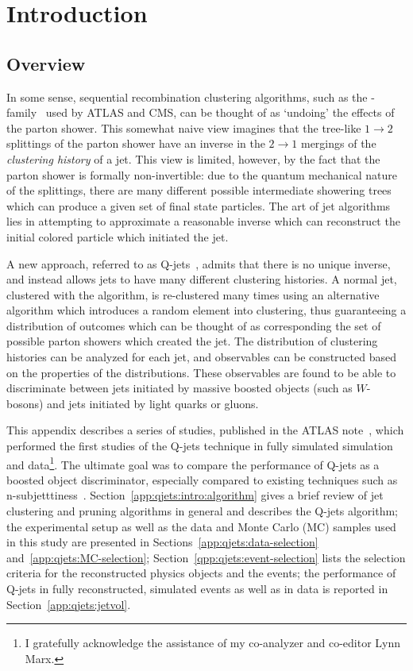 \label{appendix:qjets}

\section{Introduction}

\subsection{Overview}
\label{app:qjets:intro:overview}

In some sense, sequential recombination clustering algorithms, such as the \kt-family~\cite{Ellis:1993tq} used by ATLAS and CMS, can be thought of as `undoing' the effects of the parton shower. This somewhat naive view imagines that the tree-like $1\rightarrow2$ splittings of the parton shower have an inverse in the $2\rightarrow1$ mergings of the \textit{clustering history} of a jet. This view is limited, however, by the fact that the parton shower is formally non-invertible: due to the quantum mechanical nature of the splittings, there are many different possible intermediate showering trees which can produce a given set of final state particles. The art of jet algorithms lies in attempting to approximate a reasonable inverse which can reconstruct the initial colored particle which initiated the jet.

A new approach, referred to as Q-jets~\cite{Ellis:2012sn}, admits that there is no unique inverse, and instead allows jets to have many different clustering histories. A normal jet, clustered with the \antikt algorithm, is re-clustered many times using an alternative algorithm which introduces a random element into clustering, thus guaranteeing a distribution of outcomes which can be thought of as corresponding the set of possible parton showers which created the jet. The distribution of clustering histories can be analyzed for each jet, and observables can be constructed based on the properties of the distributions. These observables are found to be able to discriminate between jets initiated by massive boosted objects (such as $W$-bosons) and jets initiated by light quarks or gluons.

This appendix describes a series of studies, published in the ATLAS note~\cite{CITEME}, which performed the first studies of the Q-jets technique in fully simulated simulation and data\footnote{I gratefully acknowledge the assistance of my co-analyzer and co-editor Lynn Marx.}. The ultimate goal was to compare the performance of Q-jets as a boosted object discriminator, especially compared to existing techniques such as n-subjetttiness~\cite{again}. Section~\ref{app:qjets:intro:algorithm} gives a brief review of jet clustering and pruning algorithms in general and describes the Q-jets algorithm; the experimental setup as well as the data and Monte Carlo (MC) samples used in this study are presented in Sections~\ref{app:qjets:data-selection} and~\ref{app:qjets:MC-selection}; Section~\ref{qpp:qjets:event-selection} lists the selection criteria for the reconstructed physics objects and the events; the performance of Q-jets in fully reconstructed, simulated events as well as in data is reported in Section~\ref{app:qjets:jetvol}.


